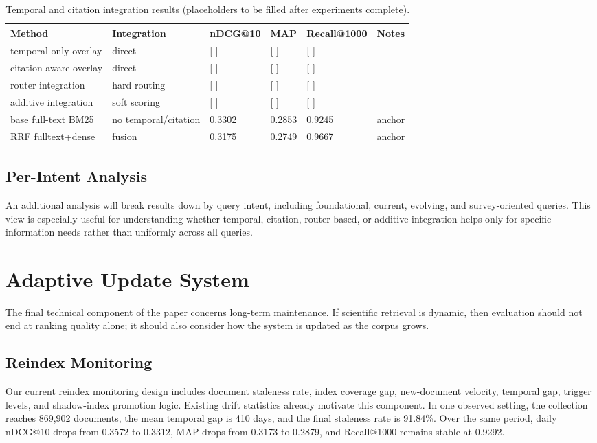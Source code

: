 \documentclass[11pt]{article}
\begin{document}
\begin{table}[ht]
\centering
\caption{Temporal and citation integration results (placeholders to be filled after experiments complete).}
\begin{tabular}{llllll}
\toprule
Method & Integration & nDCG@10 & MAP & Recall@1000 & Notes \\
\midrule
temporal-only overlay & direct & [ ] & [ ] & [ ] &  \\
citation-aware overlay & direct & [ ] & [ ] & [ ] &  \\
router integration & hard routing & [ ] & [ ] & [ ] &  \\
additive integration & soft scoring & [ ] & [ ] & [ ] &  \\
base full-text BM25 & no temporal/citation & 0.3302 & 0.2853 & 0.9245 & anchor \\
RRF fulltext+dense & fusion & 0.3175 & 0.2749 & 0.9667 & anchor \\
\bottomrule
\end{tabular}
\end{table}

\subsection{Per-Intent Analysis}

An additional analysis will break results down by query intent, including foundational, current, evolving, and survey-oriented queries. This view is especially useful for understanding whether temporal, citation, router-based, or additive integration helps only for specific information needs rather than uniformly across all queries.

\section{Adaptive Update System}

The final technical component of the paper concerns long-term maintenance. If scientific retrieval is dynamic, then evaluation should not end at ranking quality alone; it should also consider how the system is updated as the corpus grows.

\subsection{Reindex Monitoring}

Our current reindex monitoring design includes document staleness rate, index coverage gap, new-document velocity, temporal gap, trigger levels, and shadow-index promotion logic. Existing drift statistics already motivate this component. In one observed setting, the collection reaches 869,902 documents, the mean temporal gap is 410 days, and the final staleness rate is 91.84\%. Over the same period, daily nDCG@10 drops from 0.3572 to 0.3312, MAP drops from 0.3173 to 0.2879, and Recall@1000 remains stable at 0.9292.
\end{document}
